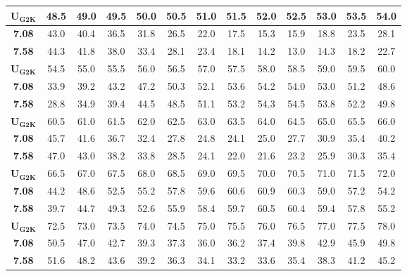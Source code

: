 \documentclass{ctexart}
\begin{document}
\begin{table}[h]
    \centering
    \begin{tabular}{ c | c c c c c c c c c c c c}
      \toprule
      $\mathbf{U_{G2K}}$  & 48.5  & 49.0  & 49.5  & 50.0  & 50.5  & 51.0  & 51.5  & 52.0  & 52.5  & 53.0  & 53.5  & 54.0\\
      \hline
      \textbf{7.08} & 43.0  & 40.4  & 36.5  & 31.8  & 26.5  & 22.0  & 17.5  & 15.3  & 15.9  & 18.8  & 23.5  & 28.1 \\
      \textbf{7.58} & 44.3  & 41.8  & 38.0  & 33.4  & 28.1  & 23.4  & 18.1  & 14.2  & 13.0  & 14.3  & 18.2  & 22.7 \\
      \hline
      $\mathbf{U_{G2K}}$  & 54.5  & 55.0  & 55.5  & 56.0  & 56.5  & 57.0  & 57.5  & 58.0  & 58.5  & 59.0  & 59.5  & 60.0\\
      \hline
      \textbf{7.08} & 33.9  & 39.2  & 43.2  & 47.2  & 50.3  & 52.1  & 53.6  & 54.2  & 54.0  & 53.0  & 51.2  & 48.6 \\
      \textbf{7.58} & 28.8  & 34.9  & 39.4  & 44.5  & 48.5  & 51.1  & 53.2  & 54.3  & 54.5  & 53.8  & 52.2  & 49.8 \\
      \hline
      $\mathbf{U_{G2K}}$  & 60.5  & 61.0  & 61.5  & 62.0  & 62.5  & 63.0  & 63.5  & 64.0  & 64.5  & 65.0  & 65.5  & 66.0\\
      \hline
      \textbf{7.08} & 45.7  & 41.6  & 36.7  & 32.4  & 27.8  & 24.8  & 24.1  & 25.0  & 27.7  & 30.9  & 35.4  & 40.2 \\
      \textbf{7.58} & 47.0  & 43.0  & 38.2  & 33.8  & 28.5  & 24.1  & 22.0  & 21.6  & 23.2  & 25.9  & 30.3  & 35.4 \\
      \hline
      $\mathbf{U_{G2K}}$  & 66.5  & 67.0  & 67.5  & 68.0  & 68.5  & 69.0  & 69.5  & 70.0  & 70.5  & 71.0  & 71.5  & 72.0\\
      \hline
      \textbf{7.08} & 44.2  & 48.6  & 52.5  & 55.2  & 57.8  & 59.6  & 60.6  & 60.9  & 60.3  & 59.0  & 57.2  & 54.2 \\
      \textbf{7.58} & 39.7  & 44.7  & 49.3  & 52.6  & 55.9  & 58.4  & 59.7  & 60.5  & 60.4  & 59.4  & 57.8  & 55.2 \\
      \hline
      $\mathbf{U_{G2K}}$  & 72.5  & 73.0  & 73.5  & 74.0  & 74.5  & 75.0  & 75.5  & 76.0  & 76.5  & 77.0  & 77.5  & 78.0 \\
      \hline
      \textbf{7.08} & 50.5  & 47.0  & 42.7  & 39.3  & 37.3  & 36.0  & 36.2  & 37.4  & 39.8  & 42.9  & 45.9  & 49.8 \\
      \textbf{7.58} & 51.6  & 48.2  & 43.6  & 39.2  & 36.3  & 34.1  & 33.2  & 33.6  & 35.4  & 38.3  & 41.2  & 45.2 \\

\end{tabular}
\end{table}
\end{document}
